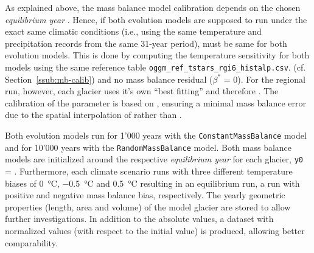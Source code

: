         As explained above, the mass balance model calibration depends on the chosen \textit{equilibrium year} \tstar{}. Hence, if both evolution models are supposed to run under the exact same climatic conditions (i.e., using the same temperature and precipitation records from the same 31-year period), \tstar{} must be same for both evolution models. This is done by computing the temperature sensitivity \mustar{} for both models using the same \tstar{} reference table \lstinline`oggm_ref_tstars_rgi6_histalp.csv`. (cf. Section~\ref{ssub:mb-calib}) and no mass balance residual ($\beta^*$ = 0). For the regional run, however, each glacier uses it's own ``best fitting'' \tstar{} and therefore \mustar. The calibration of the \mustar{} parameter is based on \citet{Marzeion2012b}, ensuring a minimal mass balance error due to the spatial interpolation of \tstar{} rather than \mustar{} \citep[for more details see][Sec. 3.3]{Maussion2019}.

        Both evolution models run for 1'000 years with the \lstinline`ConstantMassBalance` model and for 10'000 years with the \lstinline`RandomMassBalance` model. Both mass balance models are initialized around the respective \textit{equilibrium year} for each glacier, \lstinline`y0` = \tstar. Furthermore, each climate scenario runs with three different temperature biases of \SI{0}{\celsius}, \SI{-0.5}{\celsius} and \SI[retain-explicit-plus]{+0.5}{\celsius} resulting in an equilibrium run, a run with positive and negative mass balance bias, respectively. The yearly geometric properties (length, area and volume) of the model glacier are stored to allow further investigations. In addition to the absolute values, a dataset with normalized values (with respect to the initial value) is produced, allowing better comparability.

